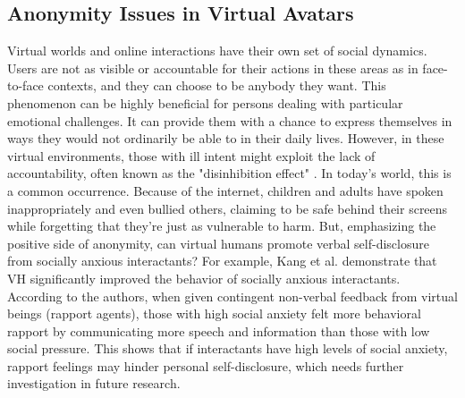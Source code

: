 \subsection{Anonymity Issues in Virtual Avatars}
Virtual worlds and online interactions have their own set of social dynamics. Users are not as visible or accountable for their actions in these areas as in face-to-face contexts, and they can choose to be anybody they want. This phenomenon can be highly beneficial for persons dealing with particular emotional challenges. It can provide them with a chance to express themselves in ways they would not ordinarily be able to in their daily lives. However, in these virtual environments, those with ill intent might exploit the lack of accountability, often known as the "disinhibition effect" \cite{WAN20, KUR18}. In today's world, this is a common occurrence. Because of the internet, children and adults have spoken inappropriately and even bullied others, claiming to be safe behind their screens while forgetting that they're just as vulnerable to harm. But, emphasizing the positive side of anonymity, can virtual humans promote verbal self-disclosure from socially anxious interactants? For example, Kang et al. \cite{KAN10} demonstrate that VH significantly improved the behavior of socially anxious interactants. According to the authors, when given contingent non-verbal feedback from virtual beings (rapport agents), those with high social anxiety felt more behavioral rapport by communicating more speech and information than those with low social pressure. This shows that if interactants have high levels of social anxiety, rapport feelings may hinder personal self-disclosure, which needs further investigation in future research.

